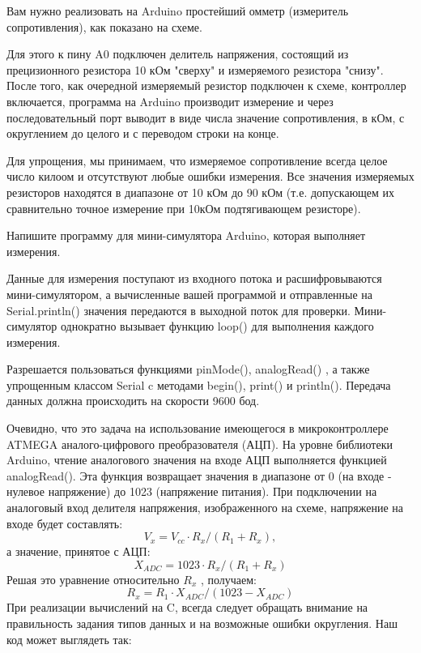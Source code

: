 
Вам нужно реализовать на Arduino простейший омметр (измеритель сопротивления), как показано на схеме. 


Для этого к пину A0 подключен делитель напряжения, состоящий из прецизионного резистора 10 кОм "сверху" и измеряемого резистора "снизу".  После того, как очередной измеряемый резистор подключен к схеме, контроллер включается, программа на Arduino производит измерение и через последовательный порт выводит в виде числа значение сопротивления, в кОм, с округлением до целого и с переводом строки на конце.   

Для упрощения,  мы принимаем, что измеряемое сопротивление всегда целое число килоом и отсутствуют любые ошибки измерения. Все значения измеряемых резисторов находятся в диапазоне от 10 кОм до 90 кОм (т.е. допускающем их сравнительно точное измерение при 10кОм подтягивающем резисторе).


Напишите программу для мини-симулятора Arduino, которая выполняет измерения.

Данные для измерения поступают из входного потока и расшифровываются мини-симулятором, а вычисленные вашей программой и отправленные на Serial.println() значения передаются в выходной поток для проверки.  Мини-симулятор однократно вызывает функцию loop() для выполнения каждого измерения. 

Разрешается пользоваться функциями pinMode(), analogRead() ,  а также упрощенным классом Serial c методами begin(), print() и println().  Передача данных должна происходить на скорости 9600 бод.

\solutionSection

Очевидно, что это задача на использование имеющегося в микроконтроллере ATMEGA аналого-цифрового преобразователя (АЦП).  На уровне библиотеки Arduino, чтение аналогового значения на входе АЦП выполняется функцией analogRead().  Эта функция возвращает значения в диапазоне от 0 (на входе - нулевое напряжение) до 1023 (напряжение питания).  При подключении на аналоговый вход делителя напряжения, изображенного на схеме,  напряжение на входе будет составлять:
$$V_x = V_{cc} \cdot R_x / (R_1 + R_x),$$ а значение, принятое с АЦП: $$X_{ADC} =  1023 \cdot  R_x / (R_1 + R_x)$$
Решая это уравнение относительно $R_x$ , получаем:  
$$R_x = R_1  \cdot X_{ADC} / (1023  - X_{ADC})$$ 
При реализации вычислений на C, всегда следует обращать внимание на правильность задания типов данных и на возможные ошибки округления.  Наш код может выглядеть так:

